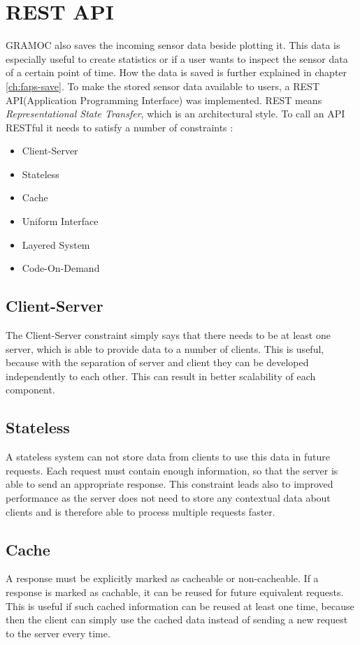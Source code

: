 \section{REST API}
GRAMOC also saves the incoming sensor data beside plotting it. This data is especially useful to create statistics or if a user wants to inspect the sensor data of a certain point of time. How the data is saved is further explained in chapter \vref{ch:faps-save}. To make the stored sensor data available to users, a REST API(Application Programming Interface) was implemented.
REST means \textit{Representational State Transfer}, which is an architectural style. To call an API RESTful it needs to satisfy a number of constraints \autocite{rest}:

\begin{itemize}
    \item Client-Server
    \item Stateless
    \item Cache
    \item Uniform Interface
    \item Layered System
    \item Code-On-Demand
\end{itemize}

\subsection{Client-Server}
The Client-Server constraint simply says that there needs to be at least one server, which is able to provide data to a number of clients. This is useful, because with the separation of server and client they can be developed independently to each other. This can result in better scalability of each component.

\subsection{Stateless}
A stateless system can not store data from clients to use this data in future requests. Each request must contain enough information, so that the server is able to send an appropriate response. This constraint leads also to improved performance as the server does not need to store any contextual data about clients and is therefore able to process multiple requests faster.

\subsection{Cache}
A response must be explicitly marked as cacheable or non-cacheable. If a response is marked as cachable, it can be reused for future equivalent requests. This is useful if such cached information can be reused at least one time, because then the client can simply use the cached data instead of sending a new request to the server every time.


